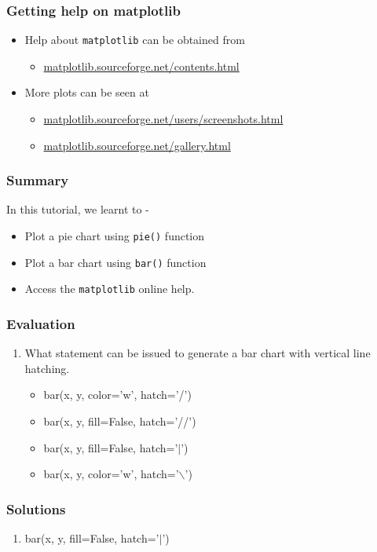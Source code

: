 \documentclass[17pt]{beamer}
\newcounter{saveenumi}
\newcommand{\conti}{\setcounter{enumi}{\value{saveenumi}}}
\begin{document}
\begin{frame}
\frametitle{Getting help on matplotlib}
\begin{itemize}
\item Help about \texttt{matplotlib} can be obtained from 
\begin{itemize}
\item \url{matplotlib.sourceforge.net/contents.html}\pause
\end{itemize}
\item More plots can be seen at
\begin{itemize}
\item \url{matplotlib.sourceforge.net/users/screenshots.html}\pause
\item \url{matplotlib.sourceforge.net/gallery.html}
\end{itemize}
\end{itemize}
\end{frame}
\begin{frame}
\frametitle{Summary}
In this tutorial, we learnt to -\pause
\begin{itemize}
\item Plot a pie chart using \texttt{pie()} function\pause
\item Plot a bar chart using \texttt{bar()} function\pause
\item Access the \texttt{matplotlib} online help.
\end{itemize}
\end{frame}
\begin{frame}
\frametitle{Evaluation}
\begin{enumerate}
\conti
\item What statement can be issued to generate a bar chart with vertical
line hatching.
\begin{itemize}
\item bar(x, y, color='w', hatch='/')
\item bar(x, y, fill=False, hatch='//')
\item bar(x, y, fill=False, hatch='$|$')
\item bar(x, y, color='w', hatch='$\backslash$')
\end{itemize}
\end{enumerate}
\end{frame}
\begin{frame}
\frametitle{Solutions}
\begin{enumerate}
\item bar(x, y, fill=False, hatch='$|$')
\end{enumerate}
\end{frame}
\end{document}
